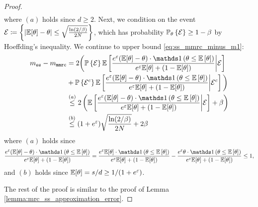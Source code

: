 \begin{proof}
\begin{align}
\end{align}
where $(a)$ holds since $d\geq 2$. Next, we condition on the event $\mathcal{E} \coloneqq \left\{ \left\lvert \mathbb{E}[\theta]-\theta\right\rvert \leq \sqrt{\frac{\ln(2/\beta)}{2N}} \right\}$, which has probability $\mathbb{P}_\theta\left\{ \mathcal{E} \right\} \geq 1-\beta$ by Hoeffding's inequality. We continue to upper bound \eqref{eq:ss_mmrc_minus_m1}:
\begin{align}
m_{\texttt{ss}} - m_\texttt{mmrc}
&= 2 \bigg( \Pr\lbp \mcal{E} \rbp\E\lb \frac{ e^\varepsilon (\E [\theta]  - \theta) \cdot \Indicator \lp \theta \leq \E\lb \theta \rb \rp }{e^\varepsilon \E [\theta] +(1-\E [\theta] )} \mv \mcal{E} \rb \\
& +\Pr\lbp \mcal{E}^c \rbp\E\lb \frac{ e^\varepsilon (\E [\theta]  - \theta) \cdot \Indicator \lp \theta \leq \E\lb \theta \rb \rp }{e^\varepsilon \E [\theta] +(1-\E [\theta] )} \mv \mcal{E}^c \rb \bigg)\\
& \stackrel{(a)}{\leq} 2 \lp \E\lb \frac{ e^\varepsilon (\E [\theta]  - \theta) \cdot \Indicator \lp \theta \leq \E\lb \theta \rb \rp }{e^\varepsilon \E [\theta] +(1-\E [\theta] )} \mv \mcal{E} \rb +\beta \rp\\
& \stackrel{(b)}{\leq} (1+e^\varepsilon) \sqrt{\frac{\ln(2/\beta)}{2N}}  + 2\beta
\end{align}
where $(a)$ holds since 
 $$ \frac{ e^\varepsilon (\E [\theta]  - \theta) \cdot \Indicator \lp \theta \leq \E\lb \theta \rb \rp }{e^\varepsilon \E [\theta] +(1-\E [\theta] )} = \frac{ e^\varepsilon \E [\theta]  \cdot \Indicator \lp \theta \leq \E\lb \theta \rb \rp }{e^\varepsilon \E [\theta] +(1-\E [\theta] )} -  \frac{ e^\varepsilon \theta \cdot \Indicator \lp \theta \leq \E\lb \theta \rb \rp }{e^\varepsilon \E [\theta] +(1-\E [\theta] )} \leq 1,$$ and $(b)$ holds since $\mathbb{E}[\theta] = s/d \geq 1/(1+e^\varepsilon)$. 

The rest of the proof is similar to the proof of Lemma \ref{lemma:mrc_ss_approximation_error}.
\end{proof}

